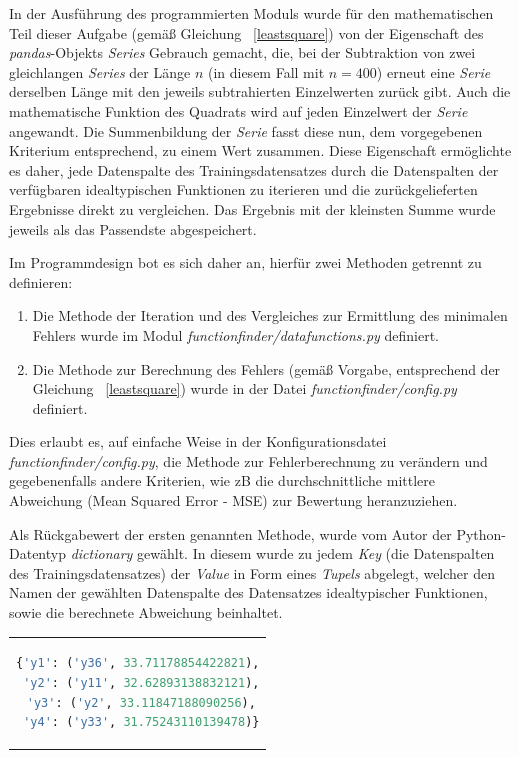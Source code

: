 In der Ausführung des programmierten Moduls wurde für den mathematischen Teil dieser Aufgabe (gemäß Gleichung ~\ref{leastsquare})  von der Eigenschaft des \emph{pandas}-Objekts \emph{Series} Gebrauch gemacht, die, bei der Subtraktion von zwei gleichlangen \emph{Series} der Länge $n$ (in diesem Fall mit $n=400$) erneut eine \emph{Serie} derselben Länge mit den jeweils subtrahierten Einzelwerten zurück gibt. Auch die mathematische Funktion des Quadrats wird auf jeden Einzelwert der \emph{Serie} angewandt. Die Summenbildung der \emph{Serie} fasst diese nun, dem vorgegebenen Kriterium entsprechend, zu einem Wert zusammen.
Diese Eigenschaft ermöglichte es daher, jede Datenspalte des Trainingsdatensatzes durch die Datenspalten der verfügbaren idealtypischen Funktionen zu iterieren und die zurückgelieferten Ergebnisse direkt zu vergleichen. Das Ergebnis mit der kleinsten Summe wurde jeweils als das Passendste abgespeichert.

Im Programmdesign bot es sich daher an, hierfür zwei Methoden getrennt zu definieren:
\begin{enumerate}
 \itemsep0pt
 \item Die Methode der Iteration und des Vergleiches zur Ermittlung des minimalen Fehlers wurde im Modul \emph{functionfinder/datafunctions.py} definiert.
 \item Die Methode zur Berechnung des Fehlers (gemäß Vorgabe, entsprechend der Gleichung ~\ref{leastsquare}) wurde in der Datei \emph{functionfinder/config.py} definiert.
\end{enumerate}

Dies erlaubt es, auf einfache Weise in der Konfigurationsdatei \emph{functionfinder/config.py}, die Methode zur Fehlerberechnung zu verändern und gegebenenfalls andere Kriterien, wie zB die durchschnittliche mittlere Abweichung (Mean Squared Error - MSE) zur Bewertung heranzuziehen. 

Als Rückgabewert der ersten genannten Methode, wurde vom Autor der Python-Datentyp \emph{dictionary} gewählt. In diesem wurde zu jedem \emph{Key} (die Datenspalten des Trainingsdatensatzes) der \emph{Value} in Form eines \emph{Tupels} abgelegt, welcher den Namen der gewählten Datenspalte des Datensatzes idealtypischer Funktionen, sowie die berechnete Abweichung beinhaltet.

\begin{tabular}{c}  %
\begin{lstlisting}[language=python,
				   caption={Darstellung des Rückgabewertes der berechneten Übereinstimmungen},
				   label=dictresult]
{'y1': ('y36', 33.71178854422821),
 'y2': ('y11', 32.62893138832121),
 'y3': ('y2', 33.11847188090256),
 'y4': ('y33', 31.75243110139478)}
\end{lstlisting}
\end{tabular}


